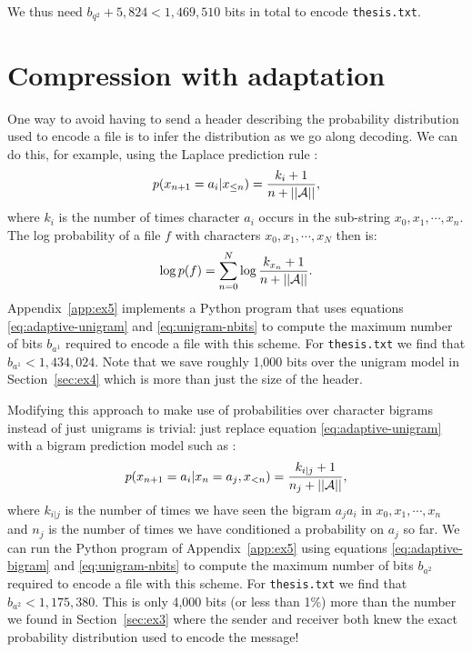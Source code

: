 \documentclass[10pt,a4paper,oneside,onecolumn]{article}
\newcommand*{\thesisTXT}{{\tt thesis.txt}\xspace}
\newcommand*{\norm}[1]{\ensuremath{\left|\left|#1\right|\right|}}
\newcommand*{\textapprox}{\raisebox{0.5ex}{\texttildelow}}
\begin{document}
We thus need $b_{q^2} + 5,824 < 1,469,510$ bits in total to encode \thesisTXT.

\section{Compression with adaptation}\label{sec:ex5}

One way to avoid having to send a header describing the probability distribution
used to encode a file is to infer the distribution as we go along decoding. We
can do this, for example, using the Laplace prediction rule
\cite[p.~2]{it-assign}:
\begin{equation}
    p(x_{n+1}=a_i|x_{\le n}) = {k_i + 1 \over n + \norm{\mathcal{A}}},
\end{equation}
where $k_i$ is the number of times character $a_i$ occurs in the sub-string
$x_0, x_1, \cdots, x_n$.
The log probability of a file $f$ with characters $x_0, x_1, \cdots, x_N$ then
is:
\begin{equation}\label{eq:adaptive-unigram}
    \log p(f) =
    \sum\limits_{n = 0}^N \log {k_{x_n} + 1 \over n + \norm{\mathcal{A}}}.
\end{equation}
Appendix~\ref{app:ex5} implements a Python program that uses equations
\eqref{eq:adaptive-unigram} and \eqref{eq:unigram-nbits} to compute the maximum
number of bits $b_{a^1}$ required to encode a file with this scheme. For
\thesisTXT we find that $b_{a^1} < 1,434,024$. Note that we save roughly 1,000
bits over the unigram model in Section~\ref{sec:ex4} which is more than just the
size of the header.

Modifying this approach to make use of probabilities over character bigrams
instead of just unigrams is trivial: just replace equation
\eqref{eq:adaptive-unigram} with a bigram prediction model such as
\cite[p.~3]{it-assign}:
\begin{equation}\label{eq:adaptive-bigram}
    p(x_{n+1}=a_i|x_{n} = a_j, x_{<n})
    = {k_{i|j} + 1 \over n_j + \norm{\mathcal{A}}},
\end{equation}
where $k_{i|j}$ is the number of times we have seen the bigram $a_ja_i$ in
$x_0, x_1, \cdots, x_n$ and $n_j$ is the number of times we have conditioned a
probability on $a_j$ so far.
We can run the Python program of Appendix~\ref{app:ex5} using equations
\eqref{eq:adaptive-bigram} and \eqref{eq:unigram-nbits} to compute the maximum
number of bits $b_{a^2}$ required to encode a file with this scheme. For
\thesisTXT we find that $b_{a^2} < 1,175,380$. This is only \textapprox 4,000
bits (or less than 1\%) more than the number we found in Section~\ref{sec:ex3}
where the sender and receiver both knew the exact probability distribution used
to encode the message!
\end{document}
